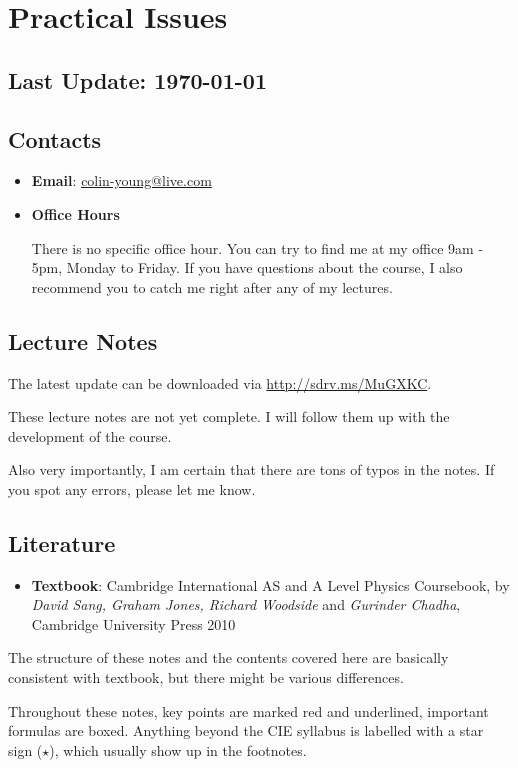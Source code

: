 \section*{Practical Issues}

\subsection*{Last Update: \today}

\subsection*{Contacts}
\begin{itemize}
\item \textbf{Email}: \url{colin-young@live.com}

\item \textbf{Office Hours}

There is no specific office hour. You can try to find me at my office 9am - 5pm, Monday to Friday. If you have questions about the course, I also recommend you to catch me right after any of my lectures.

\end{itemize}

\subsection*{Lecture Notes}

The latest update can be downloaded via \url{http://sdrv.ms/MuGXKC}.

These lecture notes are not yet complete. I will follow them up with the development of the course.

Also very importantly, I am certain that there are tons of typos in the notes. If you spot any errors, please let me know.


\subsection*{Literature}
\begin{itemize}
\item \textbf{Textbook}: Cambridge International AS and A Level Physics Coursebook, by \textit{David Sang, Graham Jones, Richard Woodside} and \textit{Gurinder Chadha}, Cambridge University Press 2010
\end{itemize}

The structure of these notes and the contents covered here are basically consistent with textbook, but there might be various differences.

Throughout these notes, key points are marked red and underlined, important formulas are boxed. Anything beyond the CIE syllabus is labelled with a star sign ($\star$), which usually show up in the footnotes.
